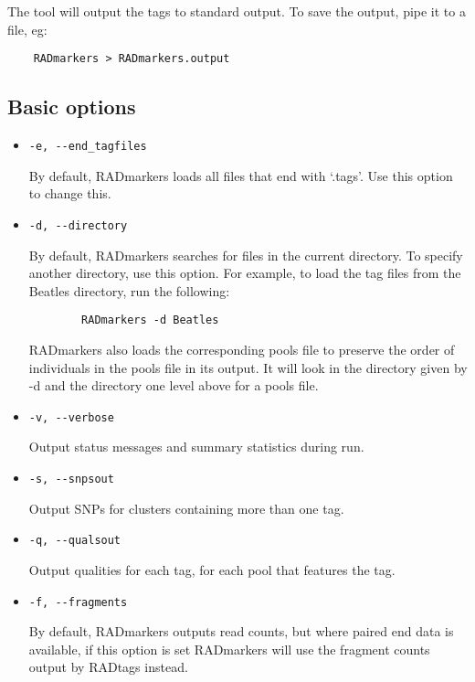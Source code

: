 \documentclass[a4paper]{article}
\begin{document}
The tool will output the tags to standard output. To save the output, pipe it to a file, eg:

\begin{verbatim}
    RADmarkers > RADmarkers.output
\end{verbatim}

\subsection{Basic options}

\begin{itemize}
    \item \verb|-e, --end_tagfiles|
    
    By default, RADmarkers loads all files that end with `.tags'. Use this option to change this.
    
    \item \verb|-d, --directory|
    
    By default, RADmarkers searches for files in the current directory. To specify another directory, use this option. For example, to load the tag files from the Beatles directory, run the following:
    
    \begin{verbatim}
        RADmarkers -d Beatles
    \end{verbatim}
    
    RADmarkers also loads the corresponding pools file to preserve the order of individuals in the pools file in its output. It will look in the directory given by -d and the directory one level above for a pools file.

    \item \verb|-v, --verbose|
    
    Output status messages and summary statistics during run.
    
    \item \verb|-s, --snpsout|
    
    Output SNPs for clusters containing more than one tag.
    
    \item \verb|-q, --qualsout|
    
    Output qualities for each tag, for each pool that features the tag.

    \item \verb|-f, --fragments|
    
    By default, RADmarkers outputs read counts, but where paired end data is available, if this option is set RADmarkers will use the fragment counts output by RADtags instead.

\end{itemize}
\end{document}
